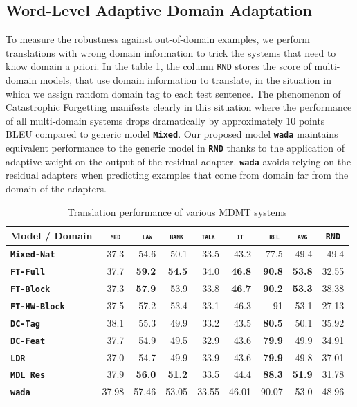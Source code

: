 \documentclass[11pt,a4paper]{article}
\newcommand{\fyDone}[1]{\done[FY]\Todo[FY:]{\textcolor{orange}{#1}}}
\newcommand{\mpTodo}[1]{\Todo[MP:]{\textcolor{green}{#1}}}
\newcommand{\domain}[1]{\texttt{\textsc{#1}}}
\newcommand{\system}[1]{\texttt{\textbf{#1}}}
\newcommand{\SB}[1]{\textbf{#1}}
\begin{document}
\subsection{Word-Level Adaptive Domain Adaptation \label{sec:wada}}
\mpTodo{wada}
To measure the robustness against out-of-domain examples, we perform translations with wrong domain information to trick the systems that need to know domain a priori. In the table \ref{tab:performance-random}, the column \domain{RND} stores the score of multi-domain models, that use domain information to translate, in the situation in which we assign random domain tag to each test sentence. The phenomenon of Catastrophic Forgetting manifests clearly in this situation where the performance of all multi-domain systems drops dramatically by approximately 10 points BLEU compared to generic model \system{Mixed}. Our proposed model \system{wada} maintains equivalent performance to the generic model in \system{RND} thanks to the application of adaptive weight on the output of the residual adapter. \system{wada} avoids relying on the residual adapters when predicting examples that come from domain far from the domain of the adapters.

\begin{table}[htbp]
  \centering
  \fyDone{Fix column size}
  \begin{tabular}{|p{3cm}|*{8}{r|}} \hline
    Model / Domain & \multicolumn{1}{c|}{\domain{ med}} & \multicolumn{1}{c|}{\domain{ law}} & \multicolumn{1}{c|}{\domain{bank}} & \multicolumn{1}{c|}{\domain{talk}} & \multicolumn{1}{c|}{\domain{ it }} & \multicolumn{1}{c|}{\domain{ rel}} & \multicolumn{1}{c|}{\domain{avg}} & \multicolumn{1}{c|}{\domain{RND}} \\ \hline  
    \system{Mixed-Nat}  & 37.3 & 54.6 & 50.1 & 33.5 & 43.2 & 77.5  &  49.4 & 49.4 \\
    \system{FT-Full}       & 37.7 & \SB{59.2} & \SB{54.5} & 34.0 & \SB{46.8} & \SB{90.8} &  \SB{53.8} & 32.55 \\
   \system{FT-Block}     & 37.3 & \SB{57.9} & 53.9 & 33.8 & \SB{46.7} & \SB{90.2}  &  \SB{53.3} & 38.38 \\ \hline 
   \system{FT-HW-Block}   & 37.5 & 57.2 & 53.4 & 33.1 & 46.3 & 91 & 53.1 & 27.13\\ 
    \system{DC-Tag}       & 38.1 & 55.3 & 49.9   & 33.2 & 43.5 & \SB{80.5}  & 50.1 & 35.92   \\
    \system{DC-Feat}      & 37.7  & 54.9 & 49.5   & 32.9 & 43.6 & \SB{79.9} & 49.9 & 34.91 \\
    \system{LDR}            & 37.0   & 54.7 & 49.9 & 33.9 & 43.6 & \SB{79.9} & 49.8          & 37.01 \\
    \system{MDL Res}     & 37.9 & \SB{56.0}  & \SB{51.2}   & 33.5   &  44.4  & \SB{88.3} & \SB{51.9} & 31.78 \\
    \system{wada}    & 37.98 &	57.46&	53.05&	33.55&	46.01&	90.07&	53.0&	48.96 \\
     \hline
  \end{tabular}
  \caption{Translation performance of various MDMT systems}
  \label{tab:performance-random}
\end{table}
\end{document}
